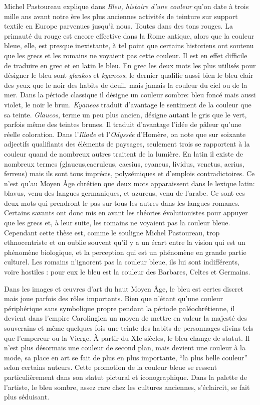 \xspace
	Michel Pastoureau explique dans \emph{Bleu, histoire d’une couleur} qu’on date à trois mille ans avant notre ère les plus anciennes activités de teinture sur support textile en Europe parvenues jusqu'à nous. Toutes dans des tons rouges. La primauté du rouge est encore effective dans la Rome antique, alors que la couleur bleue, elle, est presque inexistante, à tel point que certains historiens ont soutenu que les grecs et les romains ne voyaient pas cette couleur. Il est en effet difficile de traduire en grec et en latin le bleu. En grec les deux mots les plus utilisés pour désigner le bleu sont \emph{glaukos} et \emph{kyaneos}; le dernier qualifie aussi bien le bleu clair des yeux que le noir des habits de deuil, mais jamais la couleur du ciel ou de la mer. Dans la période classique il désigne un couleur sombre: bleu foncé mais aussi violet, le noir le brun. \emph{Kyaneos} traduit d'avantage le sentiment de la couleur que sa teinte. \emph{Glaucos}, terme un peu plus ancien, désigne autant le gris que le vert, parfois même des teintes brunes. Il traduit d'avantage l'idée de pâleur qu'une réelle coloration. Dans l'\emph{Iliade} et l'\emph{Odyssée} d'Homère, on note que sur soixante adjectifs qualifiants des éléments de paysages, seulement trois se rapportent à la couleur quand de nombreux autres traitent de la lumière. En latin il existe de nombreux termes (glaucus,caeruleus, caesius, cyaneus, lividus, venetus, aerius, ferreus) mais ils sont tous imprécis, polysémiques et d'emplois contradictoires. Ce n'est qu'au Moyen Âge chrétien que deux mots apparaissent dans le lexique latin: blavus, venu des langues germaniques, et azureus, venu de l'arabe. Ce sont ces deux mots qui prendront le pas sur tous les autres dans les langues romanes. Certains savants ont donc mis en avant les théories évolutionistes pour appuyer que les grecs et, à leur suite, les romains ne voyaient pas la couleur bleue. Cependant cette thèse est, comme le souligne Michel Pastoureau, trop ethnocentriste et on oublie souvent qu'il y a un écart entre la vision qui est un phénomène biologique, et la perception qui est un phénomène en grande partie culturel. Les romains n'ignorent pas la couleur bleue, ils lui sont indifférents, voire hostiles : pour eux le bleu est la couleur des Barbares, Celtes et Germains.

\xspace
	Dans les images et \oe{}uvres d'art du haut Moyen Âge, le bleu est certes discret mais joue parfois des rôles importants. Bien que n'étant qu'une couleur périphérique sans symbolique propre pendant la période paléochrétienne, il devient dans l'empire Carolingien un moyen de mettre en valeur la majesté des souverains et même quelques fois une teinte des habits de personnages divins tels que l’empereur ou la Vierge. À partir du XIe siècles, le bleu change de statut. Il n'est plus désormais une couleur de second plan, mais devient une couleur à la mode, sa place en art se fait de plus en plus importante, “la plus belle couleur” selon certains auteurs. Cette promotion de la couleur bleue se ressent particulièrement dans son statut pictural et iconographique. Dans la palette de l'artiste, le bleu sombre, assez rare chez les cultures anciennes, s'éclaircit, se fait plus séduisant.


